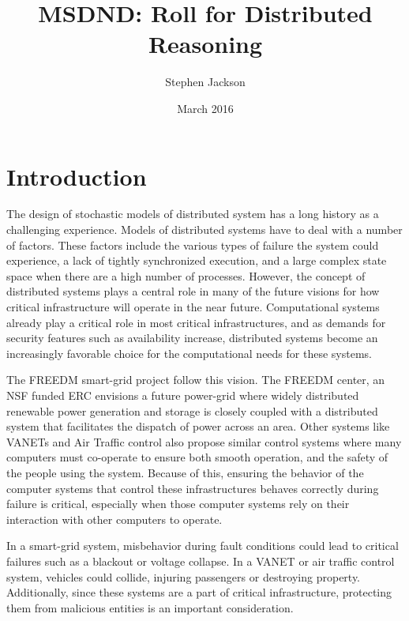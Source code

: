 \documentclass[12pt,oneside]{article}
\begin{document}
\title{MSDND: Roll for Distributed Reasoning}
\author{Stephen Jackson}
\date{March 2016}
\maketitle



\section{Introduction}

The design of stochastic models of distributed system has a long history as a challenging experience. Models of distributed systems have to deal with a number of factors. These factors include the various types of failure the system could experience, a lack of tightly synchronized execution, and a large complex state space when there are a high number of processes.  However, the concept of distributed systems plays a central role in many of the future visions for how critical infrastructure will operate in the near future. Computational systems already play a critical role in most critical infrastructures, and as demands for security features such as availability increase, distributed systems become an increasingly favorable choice for the computational needs for these systems.

The FREEDM smart-grid project follow this vision. The FREEDM center, an NSF funded ERC envisions a future power-grid where widely distributed renewable power generation and storage is closely coupled with a distributed system that facilitates the dispatch of power across an area. Other systems like VANETs and Air Traffic control also propose similar control systems where many computers must co-operate to ensure both smooth operation, and the safety of the people using the system. Because of this, ensuring the behavior of the computer systems that control these infrastructures behaves correctly during failure is critical, especially when those computer systems rely on their interaction with other computers to operate.

In a smart-grid system, misbehavior during fault conditions could lead to critical failures such as a blackout or voltage collapse. In a VANET or air traffic control system, vehicles could collide, injuring passengers or destroying property. Additionally, since these systems are a part of critical infrastructure, protecting them from malicious entities is an important consideration.
\end{document}
